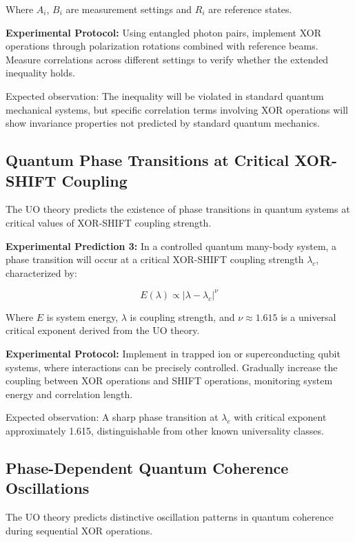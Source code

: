 Where $A_i$, $B_i$ are measurement settings and $R_i$ are reference states.

\textbf{Experimental Protocol:} Using entangled photon pairs, implement XOR operations through polarization rotations combined with reference beams. Measure correlations across different settings to verify whether the extended inequality holds.

Expected observation: The inequality will be violated in standard quantum mechanical systems, but specific correlation terms involving XOR operations will show invariance properties not predicted by standard quantum mechanics.

\subsection{Quantum Phase Transitions at Critical XOR-SHIFT Coupling}

The UO theory predicts the existence of phase transitions in quantum systems at critical values of XOR-SHIFT coupling strength.

\textbf{Experimental Prediction 3:} In a controlled quantum many-body system, a phase transition will occur at a critical XOR-SHIFT coupling strength $\lambda_c$, characterized by:

\begin{equation}
E(\lambda) \propto |\lambda - \lambda_c|^{\nu}
\end{equation}

Where $E$ is system energy, $\lambda$ is coupling strength, and $\nu \approx 1.615$ is a universal critical exponent derived from the UO theory.

\textbf{Experimental Protocol:} Implement in trapped ion or superconducting qubit systems, where interactions can be precisely controlled. Gradually increase the coupling between XOR operations and SHIFT operations, monitoring system energy and correlation length.

Expected observation: A sharp phase transition at $\lambda_c$ with critical exponent approximately 1.615, distinguishable from other known universality classes.

\subsection{Phase-Dependent Quantum Coherence Oscillations}

The UO theory predicts distinctive oscillation patterns in quantum coherence during sequential XOR operations.

